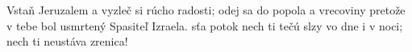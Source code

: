 Vstaň Jeruzalem a vyzleč si rúcho radosti; odej sa do popola a vrecoviny
\versseparator
pretože v tebe bol usmrtený Spasiteľ Izraela.
\versseparator
sťa potok nech ti tečú slzy vo dne i v noci;
nech ti neustáva zrenica!